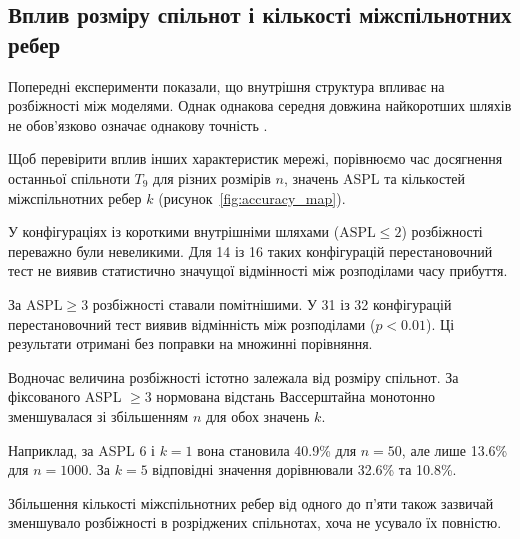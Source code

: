 \subsection{Вплив розміру спільнот
і кількості міжспільнотних ребер}
\label{sec:res_size}

Попередні експерименти показали,
що внутрішня структура впливає
на розбіжності між моделями.
Однак однакова середня довжина
найкоротших шляхів не обов'язково
означає однакову точність \TS{}.

Щоб перевірити вплив інших
характеристик мережі, порівнюємо
час досягнення останньої спільноти
$T_9$ для різних розмірів $n$,
значень ASPL та кількостей
міжспільнотних ребер $k$
(рисунок~\ref{fig:accuracy_map}).

У конфігураціях із короткими
внутрішніми шляхами
($\mathrm{ASPL}\leq2$)
розбіжності переважно були невеликими.
Для 14 із 16 таких конфігурацій
перестановочний тест не виявив
статистично значущої відмінності
між розподілами часу прибуття.

За $\mathrm{ASPL}\geq3$
розбіжності ставали помітнішими.
У 31 із 32 конфігурацій
перестановочний тест виявив
відмінність між розподілами
($p<0.01$). Ці результати
отримані без поправки
на множинні порівняння.

Водночас величина розбіжності
істотно залежала від розміру
спільнот. За фіксованого
ASPL $\geq3$ нормована
відстань Вассерштайна
монотонно зменшувалася
зі збільшенням $n$
для обох значень $k$.

Наприклад, за ASPL 6 і $k=1$
вона становила 40.9\%
для $n=50$, але лише 13.6\%
для $n=1000$.
За $k=5$ відповідні значення
дорівнювали 32.6\% та 10.8\%.

Збільшення кількості
міжспільнотних ребер від одного
до п'яти також зазвичай
зменшувало розбіжності
в розріджених спільнотах,
хоча не усувало їх повністю.

